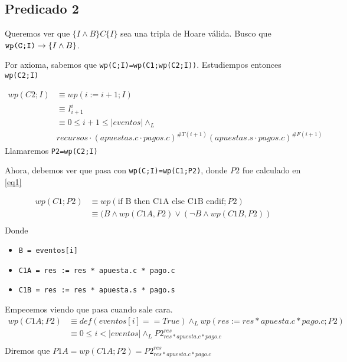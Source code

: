 \documentclass[../document.tex]{subfiles}
\begin{document}
\subsection*{Predicado 2}
Queremos ver que $\{I \land B\}C\{I\}$ sea una tripla de Hoare válida. Busco que $\verb+wp(C;I)+ \to \{I \land B\}$.

Por axioma, sabemos que \verb+wp(C;I)=wp(C1;wp(C2;I))+. Estudiempos entonces \verb|wp(C2;I)|

\begin{equation*} \label{eq1}
\begin{split}
wp(C2;I) & \equiv wp(i := i+1;I) \\
         & \equiv I^{i}_{i+1} \\
         & \equiv 0\leq i+1 \leq |eventos| \land_L\\ 
         &recursos \cdot (apuestas.c\cdot pagos.c)^{\#T(i+1)}(apuestas.s\cdot pagos.c)^{\#F(i+1)}
\end{split}
\end{equation*}
Llamaremos \verb|P2=wp(C2;I)|

Ahora, debemos ver que pasa con \verb+wp(C;I)=wp(C1;P2)+, donde $P2$ fue calculado en \ref{eq1}

\begin{equation*} \label{eq2}
\begin{split}
wp(C1;P2) & \equiv wp(\text{if B then C1A else C1B endif};P2) \\
          & \equiv (B \land wp(C1A, P2) \lor (\neg B \land wp(C1B, P2)) \\
\end{split}
\end{equation*}
Donde
\begin{itemize}
    \item \verb|B = eventos[i]|
    \item \verb|C1A = res := res * apuesta.c * pago.c|
    \item \verb|C1B = res := res * apuesta.s * pago.s|
\end{itemize}

Empecemos viendo que pasa cuando sale cara.
\begin{equation*} \label{eq2.a}
\begin{split}
wp(C1A;P2) & \equiv def(eventos[i]==True) \land_{L} wp(res := res * apuesta.c * pago.c; P2) \\
           & \equiv 0\leq i<|eventos| \land_{L} P2^{res}_{res * apuesta.c * pago.c} \\
\end{split}
\end{equation*}
Diremos que $P1A = wp(C1A;P2) = P2^{res}_{res * apuesta.c * pago.c}$
\end{document}
